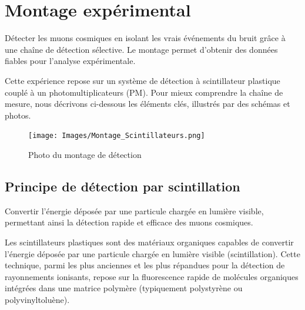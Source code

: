 \documentclass[a4paper,12pt,twoside]{article}
\begin{document}
\newpage

\section{Montage expérimental}


\vspace{1em}
\begin{center}
\begin{tcolorbox}[colback=blue!5!white, colframe=blue!60!black, title=Principe du montage expérimental]
Détecter les muons cosmiques en isolant les vrais événements du bruit grâce à une chaîne de détection sélective. Le montage permet d’obtenir des données fiables pour l’analyse expérimentale.
\end{tcolorbox}
\end{center}


Cette expérience repose sur un système de détection à scintillateur plastique couplé à un photomultiplicateurs (PM). Pour mieux comprendre la chaîne de mesure, nous décrivons ci-dessous les éléments clés, illustrés par des schémas et photos.

\begin{figure}[H]
  \centering
  \texttt{[image: Images/Montage\_Scintillateurs.png]}
  \caption{Photo du montage de détection}
  \label{fig:setup}
\end{figure}

\subsection{Principe de détection par scintillation}


\vspace{1em}
\begin{center}
\begin{tcolorbox}[colback=blue!5!white, colframe=blue!60!black, title=Principe du scintillateur plastique]
Convertir l’énergie déposée par une particule chargée en lumière visible, permettant ainsi la détection rapide et efficace des muons cosmiques.
\end{tcolorbox}
\end{center}


Les scintillateurs plastiques sont des matériaux organiques capables de convertir l'énergie déposée par une particule chargée en lumière visible (scintillation). Cette technique, parmi les plus anciennes et les plus répandues pour la détection de rayonnements ionisants, repose sur la fluorescence rapide de molécules organiques intégrées dans une matrice polymère (typiquement polystyrène ou polyvinyltoluène).
\end{document}
